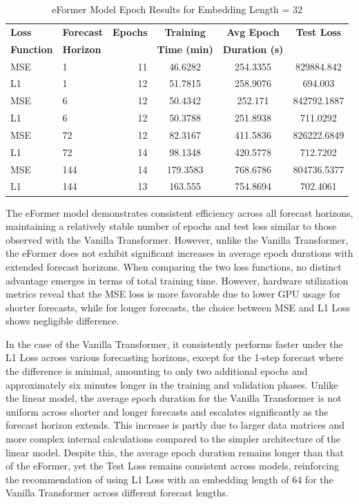 \documentclass{article}
\begin{document}
\begin{table}
    \footnotesize
    \centering
    \caption{eFormer Model Epoch Results for Embedding Length = 32}
    \begin{tabular}{l|l|r|S|S|S}
        \toprule
        \textbf{Loss} & \textbf{Forecast} & \textbf{Epochs} & \textbf{Training} & \textbf{Avg Epoch} & \textbf{Test Loss} \\
        \textbf{Function} & \textbf{Horizon} & & \textbf{Time (min)} & \textbf{Duration (s)} & \\
        \midrule
        MSE & 1 & 11 & 46.6282 & 254.3355 & 829884.842 \\
        L1 & 1 & 12 & 51.7815 & 258.9076 & 694.003 \\
        \midrule
        MSE & 6 & 12 & 50.4342 & 252.171 & 842792.1887 \\
        L1 & 6 & 12 & 50.3788 & 251.8938 & 711.0292 \\
        \midrule
        MSE & 72 & 12 & 82.3167 & 411.5836 & 826222.6849 \\
        L1 & 72 & 14 & 98.1348 & 420.5778 & 712.7202 \\
        \midrule
        MSE & 144 & 14 & 179.3583 & 768.6786 & 804736.5377 \\
        L1 & 144 & 13 & 163.555 & 754.8694 & 702.4061 \\
    \bottomrule
    \end{tabular}
    \label{tab:eformer_epoch_emb32}
\end{table}

The eFormer model demonstrates consistent efficiency across all forecast horizons, maintaining a relatively stable number of epochs and test loss similar to those observed with the Vanilla Transformer. However, unlike the Vanilla Transformer, the eFormer does not exhibit significant increases in average epoch durations with extended forecast horizons. When comparing the two loss functions, no distinct advantage emerges in terms of total training time. However, hardware utilization metrics reveal that the MSE loss is more favorable due to lower GPU usage for shorter forecasts, while for longer forecasts, the choice between MSE and L1 Loss shows negligible difference.

In the case of the Vanilla Transformer, it consistently performs faster under the L1 Loss across various forecasting horizons, except for the 1-step forecast where the difference is minimal, amounting to only two additional epochs and approximately six minutes longer in the training and validation phases. Unlike the linear model, the average epoch duration for the Vanilla Transformer is not uniform across shorter and longer forecasts and escalates significantly as the forecast horizon extends. This increase is partly due to larger data matrices and more complex internal calculations compared to the simpler architecture of the linear model. Despite this, the average epoch duration remains longer than that of the eFormer, yet the Test Loss remains consistent across models, reinforcing the recommendation of using L1 Loss with an embedding length of 64 for the Vanilla Transformer across different forecast lengths.
\end{document}
